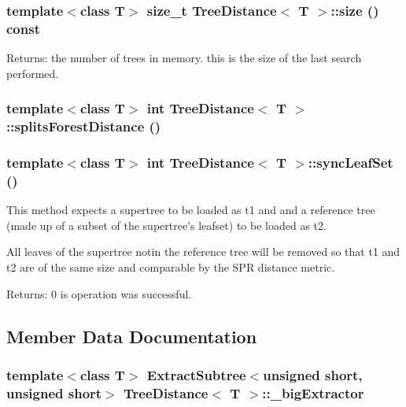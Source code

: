 \subsubsection{\setlength{\rightskip}{0pt plus 5cm}template$<$class T$>$ size\_\-t {\bf Tree\-Distance}$<$ T $>$::size () const}\label{classTreeDistance_a11}


\begin{Desc}
\item[Returns:]the number of trees in memory. this is the size of the last search performed. \end{Desc}
\subsubsection{\setlength{\rightskip}{0pt plus 5cm}template$<$class T$>$ int {\bf Tree\-Distance}$<$ T $>$::splits\-Forest\-Distance ()}\label{classTreeDistance_a9}


\subsubsection{\setlength{\rightskip}{0pt plus 5cm}template$<$class T$>$ int {\bf Tree\-Distance}$<$ T $>$::sync\-Leaf\-Set ()}\label{classTreeDistance_a10}


This method expects a supertree to be loaded as t1 and and a reference tree (made up of a subset of the supertree's leafset) to be loaded as t2. 

All leaves of the supertree notin the reference tree will be removed so that t1 and t2 are of the same size and comparable by the SPR distance metric. \begin{Desc}
\item[Returns:]0 is operation was successful. \end{Desc}


\subsection{Member Data Documentation}
\subsubsection{\setlength{\rightskip}{0pt plus 5cm}template$<$class T$>$ {\bf Extract\-Subtree}$<$unsigned short, unsigned short$>$ {\bf Tree\-Distance}$<$ T $>$::{\bf \_\-big\-Extractor}\hspace{0.3cm}{\tt  [protected]}}\label{classTreeDistance_p12}



